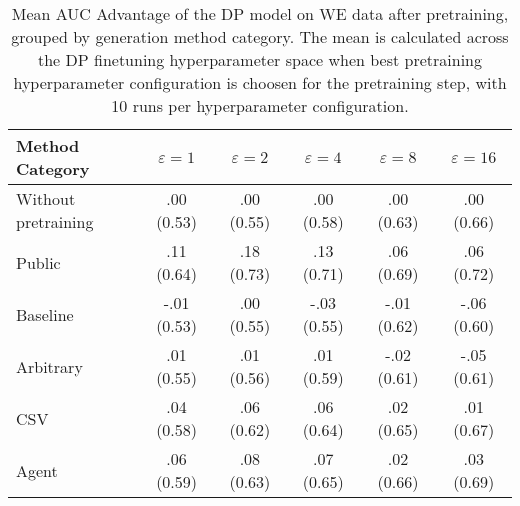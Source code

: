 \begin{table}[h!]
    \centering
    \caption{Mean AUC Advantage of the DP model on WE data after pretraining, grouped by generation method category. The mean is calculated across the DP finetuning hyperparameter space when best pretraining hyperparameter configuration is choosen for the pretraining step, with 10 runs per hyperparameter configuration.}
    \label{tab:epsilon_comparison}
    \begin{tabular}{lccccc}
    \toprule
    Method Category & $\varepsilon=1$ & $\varepsilon=2$ & $\varepsilon=4$ & $\varepsilon=8$ & $\varepsilon=16$ \\
    \midrule
    Without pretraining & .00 {\small (0.53)} & .00 {\small (0.55)} & .00 {\small (0.58)} & .00 {\small (0.63)} & .00 {\small (0.66)} \\
    \arrayrulecolor{black!50!}\midrule
    Public & \cellcolor{gold!30}.11 {\small (0.64)} & \cellcolor{gold!30}.18 {\small (0.73)} & \cellcolor{gold!30}.13 {\small (0.71)} & \cellcolor{gold!30}.06 {\small (0.69)} & \cellcolor{gold!30}.06 {\small (0.72)} \\
    \arrayrulecolor{black!50!}\midrule
    Baseline & -.01 {\small (0.53)} & .00 {\small (0.55)} & -.03 {\small (0.55)} & -.01 {\small (0.62)} & -.06 {\small (0.60)} \\
    \arrayrulecolor{black!50!}\midrule
    Arbitrary & .01 {\small (0.55)} & .01 {\small (0.56)} & .01 {\small (0.59)} & -.02 {\small (0.61)} & -.05 {\small (0.61)} \\
    \arrayrulecolor{black!50!}\midrule
    CSV & \cellcolor{bronze!30}.04 {\small (0.58)} & \cellcolor{bronze!30}.06 {\small (0.62)} & \cellcolor{bronze!30}.06 {\small (0.64)} & \cellcolor{bronze!30}.02 {\small (0.65)} & \cellcolor{bronze!30}.01 {\small (0.67)} \\
    Agent & \cellcolor{silver!30}.06 {\small (0.59)} & \cellcolor{silver!30}.08 {\small (0.63)} & \cellcolor{silver!30}.07 {\small (0.65)} & \cellcolor{silver!30}.02 {\small (0.66)} & \cellcolor{silver!30}.03 {\small (0.69)} \\
    \bottomrule
    \end{tabular}
\end{table}